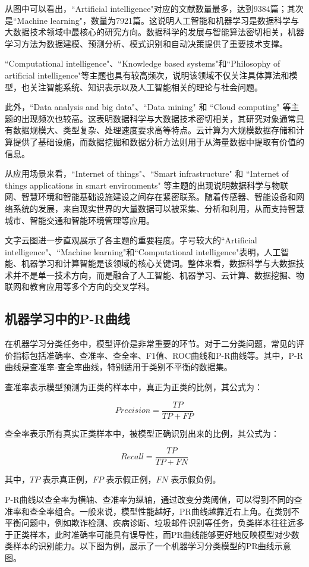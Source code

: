 \documentclass[UTF8,12pt]{ctexart}
\begin{document}
从图中可以看出，``Artificial intelligence"对应的文献数量最多，达到9384篇；其次是``Machine learning"，数量为7921篇。这说明人工智能和机器学习是数据科学与大数据技术领域中最核心的研究方向。数据科学的发展与智能算法密切相关，机器学习方法为数据建模、预测分析、模式识别和自动决策提供了重要技术支撑。

``Computational intelligence"、``Knowledge based systems"和``Philosophy of artificial intelligence"等主题也具有较高频次，说明该领域不仅关注具体算法和模型，也关注智能系统、知识表示以及人工智能相关的理论与社会问题。

此外，``Data analysis and big data"、``Data mining" 和 ``Cloud computing" 等主题的出现频次也较高。这表明数据科学与大数据技术密切相关，其研究对象通常具有数据规模大、类型复杂、处理速度要求高等特点。云计算为大规模数据存储和计算提供了基础设施，而数据挖掘和数据分析方法则用于从海量数据中提取有价值的信息。

从应用场景来看，``Internet of things"、``Smart infrastructure" 和 ``Internet of things applications in smart environments" 等主题的出现说明数据科学与物联网、智慧环境和智能基础设施建设之间存在紧密联系。随着传感器、智能设备和网络系统的发展，来自现实世界的大量数据可以被采集、分析和利用，从而支持智慧城市、智能交通和智能环境管理等应用。

文字云图进一步直观展示了各主题的重要程度。字号较大的``Artificial intelligence"、``Machine learning"和``Computational intelligence"表明，人工智能、机器学习和计算智能是该领域的核心关键词。整体来看，数据科学与大数据技术并不是单一技术方向，而是融合了人工智能、机器学习、云计算、数据挖掘、物联网和教育应用等多个方向的交叉学科。


\subsection{机器学习中的P-R曲线}
在机器学习分类任务中，模型评价是非常重要的环节。对于二分类问题，常见的评价指标包括准确率、查准率、查全率、F1值、ROC曲线和P-R曲线等。其中，P-R曲线是查准率-查全率曲线，特别适用于类别不平衡的数据集。

查准率表示模型预测为正类的样本中，真正为正类的比例，其公式为：

\[
Precision = \frac{TP}{TP + FP}
\]

查全率表示所有真实正类样本中，被模型正确识别出来的比例，其公式为：

\[
Recall = \frac{TP}{TP + FN}
\]

其中，$TP$ 表示真正例，$FP$ 表示假正例，$FN$ 表示假负例。

P-R曲线以查全率为横轴、查准率为纵轴，通过改变分类阈值，可以得到不同的查准率和查全率组合。一般来说，模型性能越好，PR曲线越靠近右上角。在类别不平衡问题中，例如欺诈检测、疾病诊断、垃圾邮件识别等任务，负类样本往往远多于正类样本，此时准确率可能具有误导性，而PR曲线能够更好地反映模型对少数类样本的识别能力。以下图为例，展示了一个机器学习分类模型的PR曲线示意图。
\end{document}
